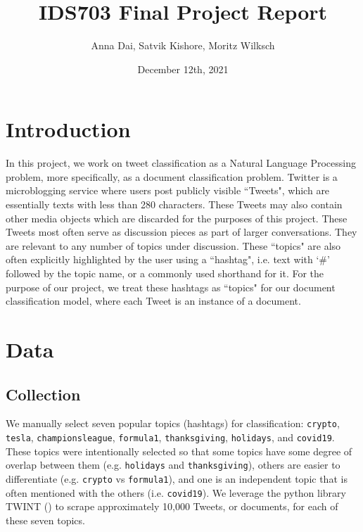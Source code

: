 \documentclass[11pt]{article}
\title{\vspace{-1.5cm}IDS703 Final Project Report}
\author{Anna Dai, Satvik Kishore, Moritz Wilksch}
\date{December 12th, 2021}
\begin{document}
\maketitle


\section{Introduction}

In this project, we work on tweet classification as a Natural Language Processing problem, more specifically, as a document classification problem. Twitter is a microblogging service where users post publicly visible ``Tweets", which are essentially texts with less than 280 characters. These Tweets may also contain other media objects which are discarded for the purposes of this project. These Tweets most often serve as discussion pieces as part of larger conversations. They are relevant to any number of topics under discussion. These ``topics" are also often explicitly highlighted by the user using a ``hashtag", i.e. text with `\#' followed by the topic name, or a commonly used shorthand for it. For the purpose of our project, we treat these hashtags as ``topics" for our document classification model, where each Tweet is an instance of a document.

\section{Data}

\subsection{Collection}
We manually select seven popular topics (hashtags) for classification: \texttt{crypto}, \texttt{tesla}, \texttt{championsleague}, \texttt{formula1}, \texttt{thanksgiving}, \texttt{holidays}, and \texttt{covid19}. These topics were intentionally selected so that some topics have some degree of overlap between them (e.g. \texttt{holidays} and \texttt{thanksgiving}), others are easier to differentiate (e.g. \texttt{crypto} vs \texttt{formula1}), and one is an independent topic that is often mentioned with the others (i.e. \texttt{covid19}). We leverage the python library TWINT (\cite{twint}) to scrape approximately 10,000 Tweets, or documents, for each of these seven topics.
\end{document}
